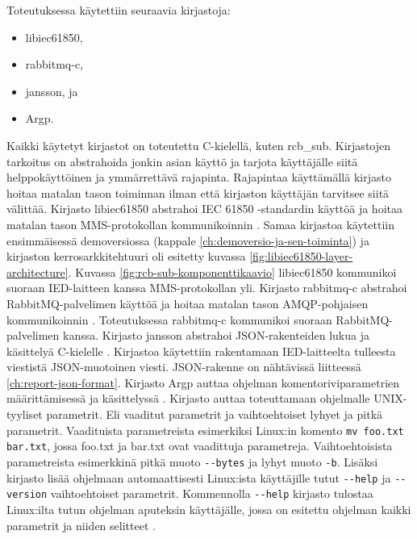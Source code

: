 Toteutuksessa käytettiin seuraavia kirjastoja:
\begin{itemize}
	\item libiec61850,
	\item rabbitmq-c,
	\item jansson, ja
	\item Argp.
\end{itemize}
Kaikki käytetyt kirjastot on toteutettu C-kielellä, kuten rcb\_sub. Kirjastojen tarkoitus on abstrahoida jonkin asian käyttö ja tarjota käyttäjälle siitä helppokäyttöinen ja ymmärrettävä rajapinta. Rajapintaa käyttämällä kirjasto hoitaa matalan tason toiminnan ilman että kirjaston käyttäjän tarvitsee siitä välittää. Kirjasto libiec61850 abstrahoi IEC 61850 -standardin käyttöä ja hoitaa matalan tason MMS-protokollan kommunikoinnin \cite{libIEC61850-repo}. Samaa kirjastoa käytettiin ensimmäisessä demoversiossa (kappale \ref{ch:demoversio-ja-sen-toiminta}) ja kirjaston kerrosarkkitehtuuri oli esitetty kuvassa \ref{fig:libiec61850-layer-architecture}. Kuvassa \ref{fig:rcb-sub-komponenttikaavio} libiec61850 kommunikoi suoraan IED-laitteen kanssa MMS-protokollan yli. Kirjasto rabbitmq-c abstrahoi RabbitMQ-palvelimen käyttöä ja hoitaa matalan tason AMQP-pohjaisen kommunikoinnin \cite{rabbitmq-c-repo}. Toteutuksessa rabbitmq-c kommunikoi suoraan RabbitMQ-palvelimen kanssa. Kirjasto jansson abstrahoi JSON-rakenteiden lukua ja käsittelyä C-kielelle \cite{jansson-repo}. Kirjastoa käytettiin rakentamaan IED-laitteelta tulleesta viestistä JSON-muotoinen viesti. JSON-rakenne on nähtävissä liitteessä \ref{ch:report-json-format}. Kirjasto Argp auttaa ohjelman komentoriviparametrien määrittämisessä ja käsittelyssä \cite{argp-glibc-guide}. Kirjasto auttaa toteuttamaan ohjelmalle UNIX-tyyliset parametrit. Eli vaaditut parametrit ja vaihtoehtoiset lyhyet ja pitkä parametrit. Vaadituista parametreista esimerkiksi Linux:in komento \texttt{mv foo.txt bar.txt}, jossa foo.txt ja bar.txt ovat vaadittuja parametreja. Vaihtoehtoisista parametreista esimerkkinä pitkä muoto \texttt{-{}-bytes} ja lyhyt muoto \texttt{-b}. Lisäksi kirjasto lisää ohjelmaan automaattisesti Linux:ista käyttäjille tutut \texttt{-{}-help} ja \texttt{-{}-version} vaihtoehtoiset parametrit. Kommennolla \texttt{-{}-help} kirjasto tulostaa Linux:ilta tutun ohjelman aputeksin käyttäjälle, jossa on esitettu ohjelman kaikki parametrit ja niiden selitteet \cite{step-by-step-into-argp}.

